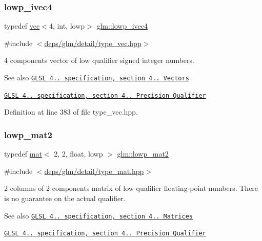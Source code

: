 \subsubsection{\texorpdfstring{lowp\+\_\+ivec4}{lowp\_ivec4}}
{\footnotesize\ttfamily typedef \hyperlink{structglm_1_1vec}{vec}$<$4, int, lowp$>$ \hyperlink{group__core__precision_ga67d57bf0fc189f8153c7c60ad80ec981}{glm\+::lowp\+\_\+ivec4}}



{\ttfamily \#include $<$\hyperlink{type__vec_8hpp}{deps/glm/detail/type\+\_\+vec.\+hpp}$>$}

4 components vector of low qualifier signed integer numbers.

\begin{DoxySeeAlso}{See also}
\href{http://www.opengl.org/registry/doc/GLSLangSpec.4.20.8.pdf}{\tt G\+L\+SL 4.. specification, section 4.. Vectors} 

\href{http://www.opengl.org/registry/doc/GLSLangSpec.4.20.8.pdf}{\tt G\+L\+SL 4.. specification, section 4.. Precision Qualifier} 
\end{DoxySeeAlso}


Definition at line 383 of file type\+\_\+vec.\+hpp.

\mbox{\label{group__core__precision_ga786e43e2a310fa4bddba3e41b786aa82}} 
\subsubsection{\texorpdfstring{lowp\+\_\+mat2}{lowp\_mat2}}
{\footnotesize\ttfamily typedef \hyperlink{structglm_1_1mat}{mat}$<$ 2, 2, float, lowp $>$ \hyperlink{group__core__precision_ga786e43e2a310fa4bddba3e41b786aa82}{glm\+::lowp\+\_\+mat2}}



{\ttfamily \#include $<$\hyperlink{type__mat_8hpp}{deps/glm/detail/type\+\_\+mat.\+hpp}$>$}

2 columns of 2 components matrix of low qualifier floating-\/point numbers. There is no guarantee on the actual qualifier.

\begin{DoxySeeAlso}{See also}
\href{http://www.opengl.org/registry/doc/GLSLangSpec.4.20.8.pdf}{\tt G\+L\+SL 4.. specification, section 4.. Matrices} 

\href{http://www.opengl.org/registry/doc/GLSLangSpec.4.20.8.pdf}{\tt G\+L\+SL 4.. specification, section 4.. Precision Qualifier} 
\end{DoxySeeAlso}


